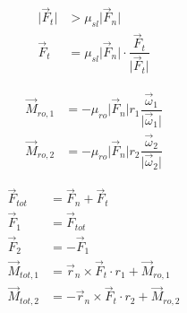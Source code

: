 \begin{equation}
\begin{aligned}
\vert\vec{F}_{t}\vert &>\mu_{sl}\vert\vec{F}_{n}\vert\\[6pt]
\vec{F}_{t}&=\mu_{sl}\vert\vec{F}_{n}\vert\cdotp\dfrac{\vec{F}_{t}}{\vert\vec{F}_{t}\vert}
\end{aligned}
\end{equation}

\begin{equation}
\begin{aligned}
\vec{M}_{ro,1} &= -\mu_{ro}\vert\vec{F}_{n}\vert{}r_{1}\dfrac{\vec{\omega}_{1}}{\vert\vec{\omega}_{1}\vert}\\[6pt]
\vec{M}_{ro,2} &= -\mu_{ro}\vert\vec{F}_{n}\vert{}r_{2}\dfrac{\vec{\omega}_{2}}{\vert\vec{\omega}_{2}\vert}
\end{aligned}
\end{equation}

\begin{equation}
\begin{aligned}
\vec{F}_{tot} &= \vec{F}_{n} + \vec{F}_{t}\\[6pt]
\vec{F}_{1} &= \vec{F}_{tot}\\[6pt]
\vec{F}_{2} &= -\vec{F}_{1}\\[6pt]
\vec{M}_{tot,1} &= \vec{r}_{n}\times\vec{F}_{t}\cdotp{}r_{1} + \vec{M}_{ro,1}\\[6pt]
\vec{M}_{tot,2} &= -\vec{r}_{n}\times\vec{F}_{t}\cdotp{}r_{2} + \vec{M}_{ro,2}
\end{aligned}
\end{equation}
\endinput
